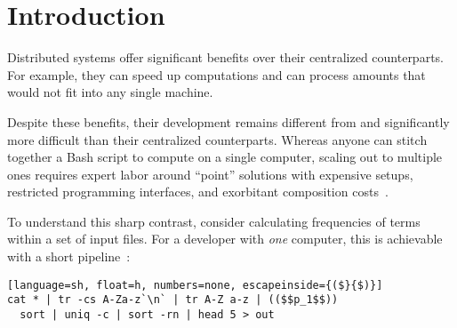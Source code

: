 \documentclass[sigplan,10pt,review,anonymous]{acmart}
\begin{document}
\section{Introduction}

% 

Distributed systems offer significant benefits over their centralized counterparts.
For example, they can speed up computations and can process amounts that would not fit into any single machine.

Despite these benefits, their development remains different from and significantly more difficult than their centralized counterparts.
Whereas anyone can stitch together a Bash script to compute on a single computer, 
   scaling out to multiple ones requires expert labor around ``point'' solutions with expensive setups, restricted programming interfaces, and exorbitant composition costs~\cite{taurus:14, dios:13, andromeda:2015, pywren:17, futuredata:18, nefele:18}.

To understand this sharp contrast, consider calculating frequencies of terms within a set of input files.
For a developer with \emph{one} computer, this is achievable with a short \unix
pipeline~\cite{bentley1986literate}:

\begin{lstlisting}[language=sh, float=h, numbers=none, escapeinside={($}{$)}]
cat * | tr -cs A-Za-z`\n` | tr A-Z a-z | (($$p_1$$))
  sort | uniq -c | sort -rn | head 5 > out
\end{lstlisting}
\end{document}
